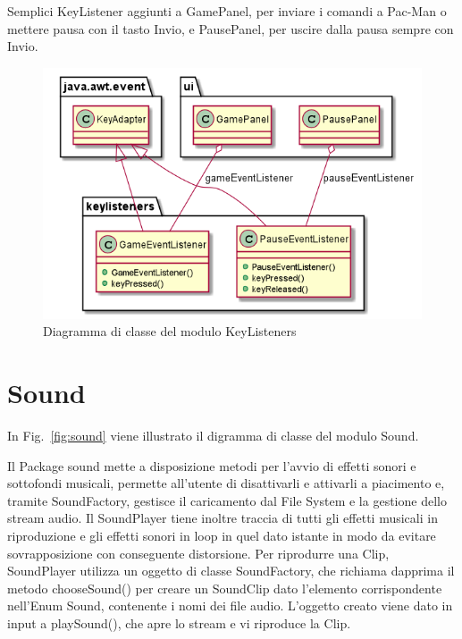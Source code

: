 \documentclass[12pt,a4paper]{report}
\begin{document}
Semplici KeyListener aggiunti a GamePanel, per inviare i comandi a Pac-Man o mettere pausa con il tasto Invio, e PausePanel, per uscire dalla pausa sempre con Invio. \newpage

\begin{figure}[tb]
\begin{center}
  \includegraphics[width=12cm]{keyListeners}
\end{center}
  \caption{Diagramma di classe del modulo KeyListeners}
  \label{fig:keyListeners}
\end{figure}


\section{Sound}\label{se:arch.sound}
In Fig.~\ref{fig:sound} viene illustrato il digramma di classe del modulo Sound.\newline

Il Package sound mette a disposizione metodi per l’avvio di effetti sonori e sottofondi musicali, permette all’utente di disattivarli e attivarli a piacimento e, tramite SoundFactory, gestisce il caricamento dal File System e la gestione dello stream audio.
Il SoundPlayer tiene inoltre traccia di tutti gli effetti musicali in riproduzione e gli effetti sonori in loop in quel dato istante in modo da evitare sovrapposizione con conseguente distorsione.
Per riprodurre una Clip, SoundPlayer utilizza un oggetto di classe SoundFactory, che richiama dapprima il metodo chooseSound() per creare un SoundClip dato l’elemento corrispondente nell’Enum Sound, contenente i nomi dei file audio. L’oggetto creato viene dato in input a playSound(), che apre lo stream e vi riproduce la Clip.\newpage
\end{document}
